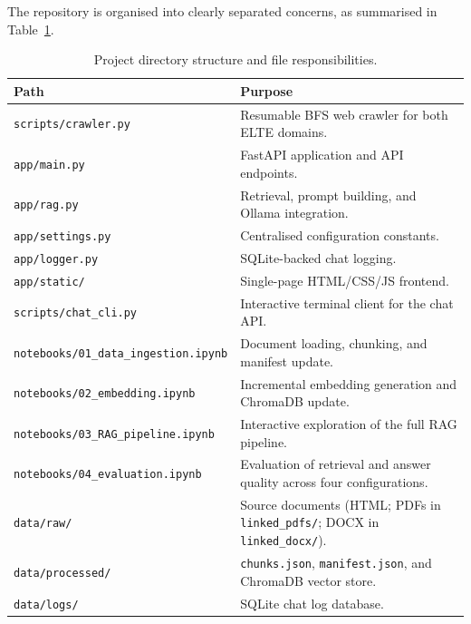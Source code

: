 The repository is organised into clearly separated concerns, as summarised in Table~\ref{tab:structure}.

\begin{table}[H]
    \centering
    \begin{tabular}{|l|p{}|}
        \hline
        \textbf{Path} & \textbf{Purpose} \\
        \hline \hline
        \texttt{scripts/crawler.py}  & Resumable BFS web crawler for both ELTE domains. \\
        \hline
        \texttt{app/main.py}       & FastAPI application and API endpoints. \\
        \hline
        \texttt{app/rag.py}        & Retrieval, prompt building, and Ollama integration. \\
        \hline
        \texttt{app/settings.py}   & Centralised configuration constants. \\
        \hline
        \texttt{app/logger.py}     & SQLite-backed chat logging. \\
        \hline
        \texttt{app/static/}       & Single-page HTML/CSS/JS frontend. \\
        \hline
        \texttt{scripts/chat\_cli.py} & Interactive terminal client for the chat API. \\
        \hline
        \texttt{notebooks/01\_data\_ingestion.ipynb} & Document loading, chunking, and manifest update. \\
        \hline
        \texttt{notebooks/02\_embedding.ipynb}       & Incremental embedding generation and ChromaDB update. \\
        \hline
        \texttt{notebooks/03\_RAG\_pipeline.ipynb}   & Interactive exploration of the full RAG pipeline. \\
        \hline
        \texttt{notebooks/04\_evaluation.ipynb}      & Evaluation of retrieval and answer quality across four configurations. \\
        \hline
        \texttt{data/raw/}         & Source documents (HTML; PDFs in \texttt{linked\_pdfs/}; DOCX in \texttt{linked\_docx/}). \\
        \hline
        \texttt{data/processed/}   & \texttt{chunks.json}, \texttt{manifest.json}, and ChromaDB vector store. \\
        \hline
        \texttt{data/logs/}        & SQLite chat log database. \\
        \hline
    \end{tabular}
    \caption{Project directory structure and file responsibilities.}
    \label{tab:structure}
\end{table}
